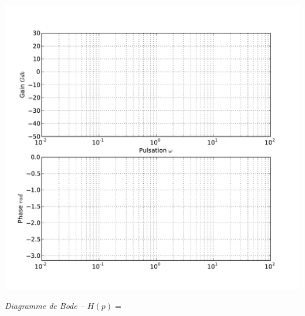 \documentclass[10pt,oneside]{article}
\begin{document}
\begin{center}
\includegraphics[width=.9\textwidth]{png/bode_vierge}

\textit{Diagramme de Bode -- $H(p)=$}
\end{center}






\end{document}
